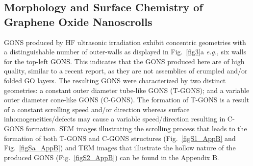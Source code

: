 \subsection{Morphology and Surface Chemistry of Graphene Oxide Nanoscrolls}
GONS produced by HF ultrasonic irradiation exhibit concentric geometries with a distinguishable number of outer-walls as displayed in Fig.~\ref{fig3}a \textit{e.g.}, six walls for the top-left GONS. This indicates that the GONS produced here are of high quality, similar to a recent report,\cite{Kim2014} as they are not assemblies of crumpled and/or folded GO layers. The resulting GONS were characterized by two distinct geometries: a constant outer diameter tube-like GONS (T-GONS); and a variable outer diameter cone-like GONS (C-GONS). The formation of T-GONS is a result of a constant scrolling speed and/or direction whereas surface inhomogeneities/defects may cause a variable speed/direction resulting in C-GONS formation.\cite{Hwang2014} SEM images illustrating the scrolling process that leads to the formation of both T-GONS and C-GONS structures (Fig.~\ref{figS1_AppB} and Fig.~\ref{figSa_AppB}) and TEM images that illustrate the hollow nature of the produced GONS (Fig.~\ref{figS2_AppB}) can be found in the Appendix B.

